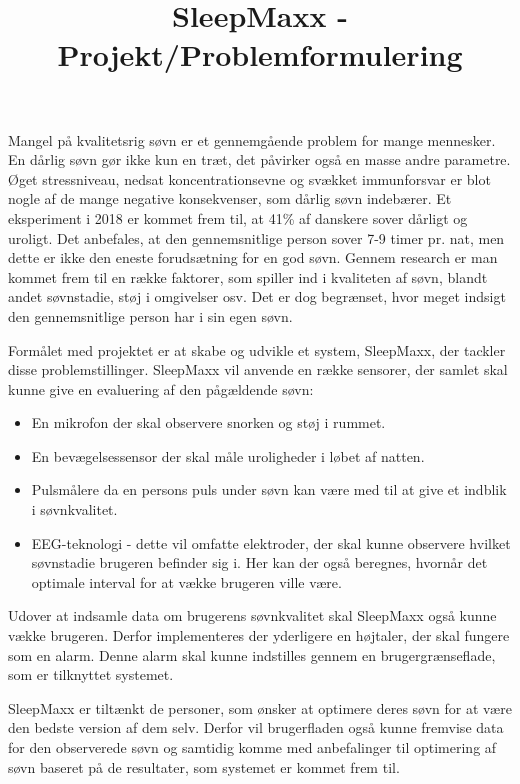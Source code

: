 \documentclass[a4paper,12pt]{article}
\title{SleepMaxx - Projekt/Problemformulering}
\author{}
\date{}
\begin{document}
\maketitle

Mangel på kvalitetsrig søvn er et gennemgående problem for mange mennesker. En dårlig søvn gør ikke kun en træt, det påvirker også en masse andre parametre. Øget stressniveau, nedsat koncentrationsevne og svækket immunforsvar er blot nogle af de mange negative konsekvenser, som dårlig søvn indebærer. Et eksperiment i 2018 er kommet frem til, at 41\% af danskere sover dårligt og uroligt. Det anbefales, at den gennemsnitlige person sover 7-9 timer pr. nat, men dette er ikke den eneste forudsætning for en god søvn. Gennem research er man kommet frem til en række faktorer, som spiller ind i kvaliteten af søvn, blandt andet søvnstadie, støj i omgivelser osv. Det er dog begrænset, hvor meget indsigt den gennemsnitlige person har i sin egen søvn.

Formålet med projektet er at skabe og udvikle et system, SleepMaxx, der tackler disse problemstillinger. SleepMaxx vil anvende en række sensorer, der samlet skal kunne give en evaluering af den pågældende søvn:

\begin{itemize}
    \item En mikrofon der skal observere snorken og støj i rummet.
    \item En bevægelsessensor der skal måle uroligheder i løbet af natten.
    \item Pulsmålere da en persons puls under søvn kan være med til at give et indblik i søvnkvalitet.
    \item EEG-teknologi - dette vil omfatte elektroder, der skal kunne observere hvilket søvnstadie brugeren befinder sig i. Her kan der også beregnes, hvornår det optimale interval for at vække brugeren ville være.
\end{itemize}

Udover at indsamle data om brugerens søvnkvalitet skal SleepMaxx også kunne vække brugeren. Derfor implementeres der yderligere en højtaler, der skal fungere som en alarm. Denne alarm skal kunne indstilles gennem en brugergrænseflade, som er tilknyttet systemet.

SleepMaxx er tiltænkt de personer, som ønsker at optimere deres søvn for at være den bedste version af dem selv. Derfor vil brugerfladen også kunne fremvise data for den observerede søvn og samtidig komme med anbefalinger til optimering af søvn baseret på de resultater, som systemet er kommet frem til.
\end{document}
